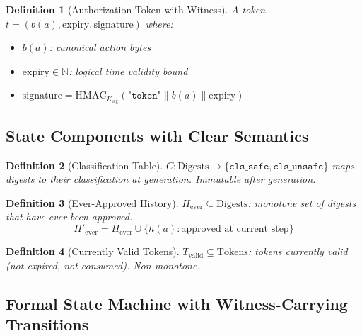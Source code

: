 \documentclass[12pt]{article}
\newtheorem{definition}{Definition}[section]
\begin{document}
\begin{definition}[Authorization Token with Witness]
A token $t = (b(a), \text{expiry}, \text{signature})$ where:
\begin{itemize}
    \item $b(a)$: canonical action bytes
    \item $\text{expiry} \in \mathbb{N}$: logical time validity bound
    \item $\text{signature} = \mathrm{HMAC}_{K_{\text{sig}}}(\texttt{"token"}\|b(a)\|\text{expiry})$
\end{itemize}
\end{definition}

\subsection{State Components with Clear Semantics}

\begin{definition}[Classification Table]
$C: \mathrm{Digests} \to \{\texttt{cls\_safe}, \texttt{cls\_unsafe}\}$ maps digests to their classification at generation. Immutable after generation.
\end{definition}

\begin{definition}[Ever-Approved History]
$H_{\text{ever}} \subseteq \mathrm{Digests}$: monotone set of digests that have ever been approved.
\[
H'_{\text{ever}} = H_{\text{ever}} \cup \{h(a) : \text{approved at current step}\}
\]
\end{definition}

\begin{definition}[Currently Valid Tokens]
$T_{\text{valid}} \subseteq \mathrm{Tokens}$: tokens currently valid (not expired, not consumed). Non-monotone.
\end{definition}

\subsection{Formal State Machine with Witness-Carrying Transitions}
\end{document}
